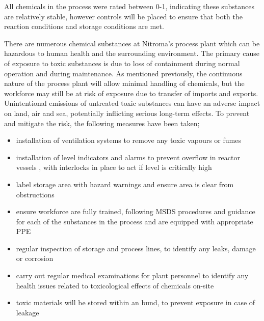 All chemicals in the process were rated between 0-1, indicating these substances are relatively stable, however controls will be placed to ensure that both the reaction conditions and storage conditions are met. 

There are numerous chemical substances at Nitroma's process plant which can be hazardous to human health and the surrounding environment. The primary cause of exposure to toxic substances is due to loss of containment during normal operation and during maintenance. As mentioned previously, the continuous nature of the process plant will allow minimal handling of chemicals, but the workforce may still be at risk of exposure due to transfer of imports and exports. Unintentional emissions of untreated toxic substances can have an adverse impact on land, air and sea, potentially inflicting serious long-term effects. To prevent and mitigate the risk, the following measures have been taken;

\begin{itemize}
    \item installation of ventilation systems to remove any toxic vapours or fumes 
    \item installation of level indicators and alarms to prevent overflow in reactor vessels , with interlocks in place to act if level is critically high
    \item label storage area with hazard warnings and ensure area is clear from obstructions
    \item ensure workforce are fully trained, following MSDS procedures and guidance for each of the substances in the process and are equipped with appropriate PPE 
    \item regular inspection of storage and process lines, to identify any leaks, damage or corrosion 
    \item carry out regular medical examinations for plant personnel to identify any health issues related to toxicological effects of chemicals on-site
\item toxic materials will be stored within an bund, to prevent exposure in case of leakage 
\end{itemize}



